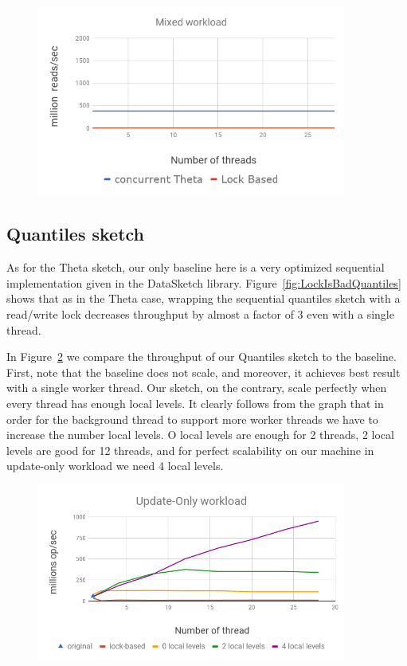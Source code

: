 \begin{figure}[h]
  \centering
  \includegraphics*[width=4in]{images/concurrentThetaReads}
  \caption{}
   \label{fig:ConccurentThetaReads}
\end{figure}




\subsection{Quantiles sketch}
\label{sub:quantilesExp}

As for the Theta sketch, our only baseline here is a very
optimized sequential implementation given in the DataSketch
library.
Figure~\ref{fig:LockIsBadQuantiles} shows that as in the Theta
case, wrapping the sequential quantiles sketch with a read/write
lock decreases throughput by almost a factor of 3 even with a
single thread.

In Figure~\ref{fig:ConccurentQuantilesUpdate} we compare the
throughput of our Quantiles sketch to the baseline.
First, note that the baseline does not scale, and moreover, it
achieves best result with a single worker thread.
Our sketch, on the contrary, scale perfectly when every thread
has enough local levels.
It clearly follows from the graph that in order for the
background thread to support more worker threads we have to
increase the number local levels.
O local levels are enough for 2 threads, 2 local levels are good
for 12 threads, and for perfect scalability on our machine in
update-only workload we need 4 local levels.



\begin{figure}[h]
  \centering
  \includegraphics*[width=4in]{images/QuantilesUpdate}
  \caption{}
   \label{fig:ConccurentQuantilesUpdate}
\end{figure}

